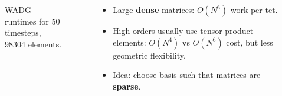\documentclass[compress]{beamer}
\begin{document}
{\begin{columns}
\begin{column}{.55\textwidth}
\begin{figure}
\caption*{\scriptsize WADG runtimes for 50 timesteps, 98304 elements.}
\end{figure}
\end{column}
\begin{column}{.45\textwidth}
\vspace{-2em}
\begin{itemize}
\item Large \textbf{dense} matrices: $O(N^6)$ work per tet.
\vspace{1em}
\item High orders usually use tensor-product elements: $O(N^{4})$ vs $O(N^{6})$ cost, but less geometric flexibility.
\vspace{1em}
\item Idea: choose basis such that matrices are \textbf{sparse}.
\end{itemize}
\end{column}
\end{columns}
}
\end{document}
